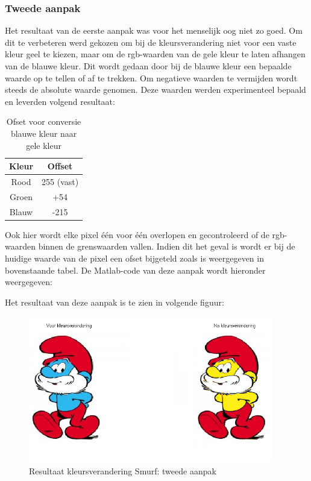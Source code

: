 		\subsubsection{Tweede aanpak}
			\par Het resultaat van de eerste aanpak was voor het menselijk oog niet zo goed. Om dit te verbeteren werd gekozen om bij de kleursverandering niet voor
			een vaste kleur geel te kiezen, maar om de rgb-waarden van de gele kleur te laten afhangen van de blauwe kleur. Dit wordt gedaan door bij de blauwe kleur
			een bepaalde waarde op te tellen of af te trekken. Om negatieve waarden te vermijden wordt steeds de absolute waarde genomen. Deze waarden werden 
			experimenteel bepaald en leverden volgend resultaat: \noindent
			
					\begin{table}[H]
					\centering
					\begin{tabular}{cc}
					\hline
					Kleur & Offset   	  \\ \hline
					Rood  & 255 (vast)    \\
					Groen & +54           \\
					Blauw & -215          \\ \hline			
					\end{tabular}
					\caption{Ofset voor conversie blauwe kleur naar gele kleur}
					\end{table}
			\newpage
			
			\par Ook hier wordt elke pixel \'e\'en voor \'e\'en overlopen en gecontroleerd of de rgb-waarden binnen de grenswaarden vallen. Indien dit het geval is 
			wordt er bij de huidige waarde van de pixel een ofset bijgeteld zoals is weergegeven in bovenstaande tabel. De Matlab-code van deze aanpak wordt hieronder
			weergegeven: \bigskip
			
			
			
			\newpage
			
			\par Het resultaat van deze aanpak is te zien in volgende figuur:
			
				\begin{figure}[H]
				\centering
				\includegraphics[width=0.95\textwidth]{Images/resultaat_smurf_2.png}
				\caption{Resultaat kleursverandering Smurf: tweede aanpak}
				\label{fig:smurf_tweede_aanpak}
				\end{figure}
			
